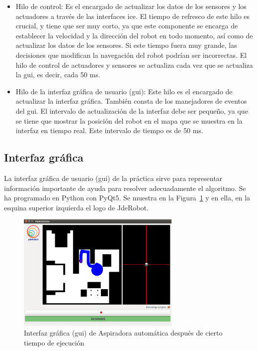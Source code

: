 \begin{itemize}
\item Hilo de control: Es el encargado de actualizar los datos de los sensores y los actuadores a través de las interfaces \acrshort{ice}. El tiempo de refresco de este hilo es crucial, y tiene que ser muy corto, ya que este componente se encarga de establecer la velocidad y la dirección del robot en todo momento, así como de actualizar los datos de los sensores. Si este tiempo fuera muy grande, las decisiones que modifican la navegación del robot podrían ser incorrectas. El hilo de control de actuadores y sensores se actualiza cada vez que se actualiza la \acrshort{gui}, es decir, cada 50 ms.

\item	Hilo de la interfaz gráfica de usuario (\acrshort{gui}): Este hilo es el encargado de actualizar la interfaz gráfica. También consta de los manejadores de eventos del \acrshort{gui}. El intervalo de actualización de la interfaz debe ser pequeño, ya que se tiene que mostrar la posición del robot en el mapa que se muestra en la interfaz en tiempo real. Este intervalo de tiempo es de 50 ms.

\end{itemize}


\subsection{Interfaz gráfica}
La interfaz gráfica de usuario (\acrshort{gui}) de la práctica sirve para representar información importante de ayuda para resolver adecuadamente el algoritmo. Se ha programado en Python con PyQt5. Se muestra en la Figura~\ref{fig.GUI2} y en ella, en la esquina superior izquierda el logo de JdeRobot. \\

\begin{figure}[H]
  \begin{center}
    \includegraphics[width=0.7\textwidth]{figures/Vacuum/GUI2.png}
		\caption{Interfaz gráfica (\acrshort{gui}) de Aspiradora automática después de cierto tiempo de ejecución}
		\label{fig.GUI2}
		\end{center}
\end{figure}

